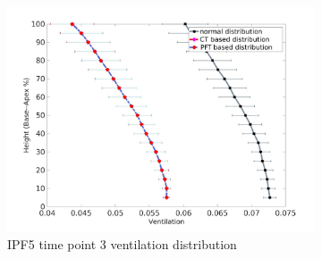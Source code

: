 \begin{figure}[htbp]  
\centering
\begin{subfigure}{.6\linewidth}%
  \includegraphics[width=\linewidth,trim={{.0\wd0} {.0\wd0} {.0\wd0} {.0\wd0}},clip]{Appendix/Image_AppexB/IPF513/IPF513_VentilationAgainstLungHeight.png} %
  \caption{IPF5 time point 3 ventilation distribution}
  \label{fig:IPF513VQDistribution-a} 
\end{subfigure} 
\begin{subfigure}{.6\linewidth}%

\end{subfigure}
\end{figure}
